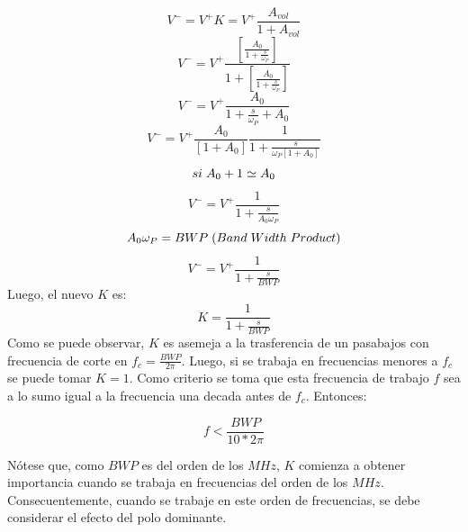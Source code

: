 \begin{displaymath} V^- = V^+ K = V^+\frac{A_{vol}}{1+A_{vol}} \end{displaymath}  
\begin{displaymath} V^- = V^+\frac{[\frac{A_{0}}{1+\frac{s}{\omega_P}}]}{1+[\frac{A_{0}}{1+\frac{s}{\omega_P}}]} \end{displaymath}  
\begin{displaymath} V^- = V^+ \frac{A_0}{1+ \frac{s}{\omega_P} + A_0} \end{displaymath}  
\begin{displaymath} V^- = V^+ \frac{A_0}{[1+ A_0]} \frac{1}{1+ \frac{s}{\omega_P [1 + A_0]}} \end{displaymath}  
\begin{displaymath} si \hspace{1mm} A_0 + 1 \simeq A_0 \end{displaymath}  
\begin{displaymath} V^- = V^+ \frac{1}{1 + \frac{s}{A_0 \omega_P}}  \end{displaymath}  
\begin{displaymath} A_0 \omega_P = BWP \hspace{1mm}(Band\hspace{1mm}Width\hspace{1mm}Product) \end{displaymath}  
\begin{displaymath} V^- = V^+ \frac{1}{1 + \frac{s}{BWP}}  \end{displaymath}  
Luego, el nuevo $K$ es:
\begin{displaymath} K = \frac{1}{1 + \frac{s}{BWP}}  \end{displaymath}  
Como se puede observar, $K$ es asemeja a la trasferencia de un pasabajos con frecuencia de corte en $f_c = \frac{BWP}{2\pi}$. Luego, si se trabaja en frecuencias menores a $f_c$ se puede tomar $K=1$. Como criterio se toma que esta frecuencia de trabajo $f$ sea 
a lo sumo igual a la frecuencia una decada antes de $f_c$. Entonces:

\begin{equation} f < \frac{BWP}{10 *2\pi} \label{ej2_ecua_condicion_1}\end{equation}

Nótese que, como $BWP$ es del orden de los $MHz$, $K$ comienza a obtener importancia cuando se trabaja en frecuencias del orden de los $MHz$. Consecuentemente, cuando se trabaje en este orden de frecuencias, se debe considerar el efecto del polo dominante.  


